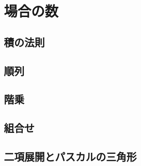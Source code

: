 \documentclass[../../math-imaging]{subfiles}
\begin{document}
\section{場合の数}

\wip

\subsection{積の法則}

\subsection{順列}

\subsection{階乗}

\subsection{組合せ}

\subsection{二項展開とパスカルの三角形}
\end{document}
